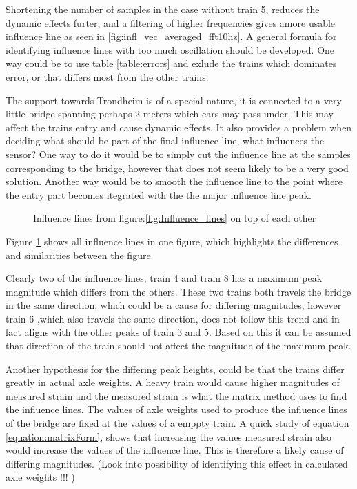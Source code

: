 Shortening the number of samples in the case without train 5, reduces the dynamic effects furter, and a filtering of higher frequencies gives amore usable influence line as seen in \ref{fig:infl_vec_averaged_fft10hz}.
A general formula for identifying influence lines with too much oscillation should be developed. One way could be to use table \ref{table:errors} and exlude the trains which dominates error, or that differs most from the other trains.

The support towards Trondheim is of a special nature, it is connected to a very little bridge spanning perhaps 2 meters which cars may pass under. This may affect the trains entry and cause dynamic effects. It also provides a problem when deciding what should be part of the final influence line, what influences the sensor?
One way to do it would be to simply cut the influence line at the samples corresponding to the bridge, however that does not seem likely to be a very good solution. Another way would be to smooth the influence line to the point where the entry part becomes itegrated with the the major influence line peak.
\begin{figure}[H]
	\begin{adjustbox}{center}
		
	\end{adjustbox}
	\caption{Influence lines from figure:\ref{fig:Influence_lines} on top of each other}
	\label{fig:infl_all_trains}
\end{figure}

Figure \ref{fig:infl_all_trains} shows all influence lines in one figure, which highlights the differences and similarities between the figure.

Clearly two of the influence lines, train 4 and train 8 has a maximum peak magnitude which differs from the others. These two trains both travels the bridge in the same direction, which could be a cause for differing magnitudes, however train 6 ,which also travels the same direction, does not follow this trend and in fact aligns with the other peaks of train 3 and 5. Based on this it can be assumed that direction of the train should not affect the magnitude of the maximum peak.

Another hypothesis for the differing peak heights, could be that the trains differ greatly in actual axle weights. A heavy train would cause higher magnitudes of measured strain and the measured strain is what the matrix method uses to find the influence lines. The values of axle weights used to produce the influence lines of the bridge are fixed at the values of a emppty train. A quick study of equation \ref{equation:matrixForm}, shows that increasing the values measured strain also would increase the values of the influence line. This is therefore a likely cause of differing magnitudes. (Look into possibility of identifying this effect in calculated axle weights !!! )

